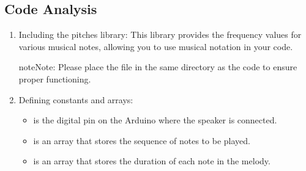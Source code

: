 \documentclass[a4paper,11pt,english]{sphinxmanual}
\begin{document}
\subsection{Code Analysis}
\label{\detokenize{Basic_Project/Audio_Module_Speaker:code-analysis}}\begin{enumerate}
%
\item {} 
\sphinxAtStartPar
Including the pitches library:
This library provides the frequency values for various musical notes, allowing you to use musical notation in your code.

\begin{sphinxadmonition}{note}{Note:}
\sphinxAtStartPar
Please place the  file in the same directory as the code to ensure proper functioning. 

\noindent{}
\end{sphinxadmonition}

\begin{sphinxVerbatim}[commandchars=\\\{\}]
\end{sphinxVerbatim}

\item {} 
\sphinxAtStartPar
Defining constants and arrays:
\begin{itemize}
\item {} 
\sphinxAtStartPar
{} is the digital pin on the Arduino where the speaker is connected.

\item {} 
\sphinxAtStartPar
{} is an array that stores the sequence of notes to be played.

\item {} 
\sphinxAtStartPar
{} is an array that stores the duration of each note in the melody.

\end{itemize}


\end{enumerate}
\end{document}
